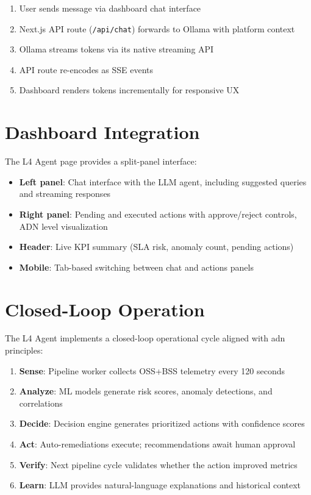 \begin{enumerate}
    \item User sends message via dashboard chat interface
    \item Next.js API route (\texttt{/api/chat}) forwards to Ollama with platform context
    \item Ollama streams tokens via its native streaming API
    \item API route re-encodes as SSE events
    \item Dashboard renders tokens incrementally for responsive UX
\end{enumerate}

\section{Dashboard Integration}

The L4 Agent page provides a split-panel interface:

\begin{itemize}
    \item \textbf{Left panel}: Chat interface with the LLM agent, including suggested queries and streaming responses
    \item \textbf{Right panel}: Pending and executed actions with approve/reject controls, ADN level visualization
    \item \textbf{Header}: Live KPI summary (SLA risk, anomaly count, pending actions)
    \item \textbf{Mobile}: Tab-based switching between chat and actions panels
\end{itemize}

\section{Closed-Loop Operation}

The L4 Agent implements a closed-loop operational cycle aligned with \gls{adn} principles:

\begin{enumerate}
    \item \textbf{Sense}: Pipeline worker collects OSS+BSS telemetry every 120 seconds
    \item \textbf{Analyze}: ML models generate risk scores, anomaly detections, and correlations
    \item \textbf{Decide}: Decision engine generates prioritized actions with confidence scores
    \item \textbf{Act}: Auto-remediations execute; recommendations await human approval
    \item \textbf{Verify}: Next pipeline cycle validates whether the action improved metrics
    \item \textbf{Learn}: LLM provides natural-language explanations and historical context
\end{enumerate}
